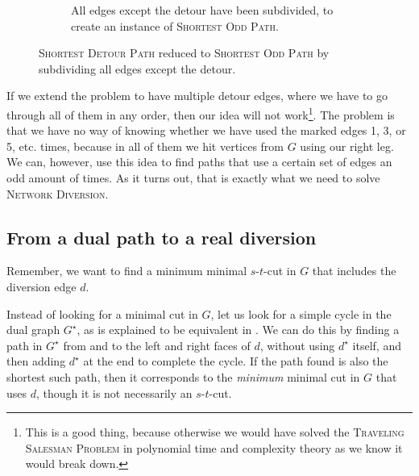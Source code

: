 \begin{figure}[H]
\begin{subfigure}{.45\textwidth}
{
        }
        \caption{All edges except the detour have been subdivided, to create an instance of \textsc{Shortest Odd Path}.}
        \label{figure:subdivided-detour}
    \end{subfigure}%
    \caption{\textsc{Shortest Detour Path} reduced to \textsc{Shortest Odd Path} by subdividing all edges except the detour.}
    \label{figure:subdividing-detours}
\end{figure}

If we extend the problem to have multiple detour edges, where we have to go through all of them in any order, then our idea will not work\footnote{This is a good thing, because otherwise we would have solved the \textsc{Traveling Salesman Problem} in polynomial time and complexity theory as we know it would break down.}.
The problem is that we have no way of knowing whether we have used the marked edges 1, 3, or 5, etc. times, because in all of them we hit vertices from $G$ using our right leg. We can, however, use this idea to find paths that use a certain set of edges an odd amount of times. As it turns out, that is exactly what we need to solve \textsc{Network Diversion}.

\subsection{From a dual path to a real diversion}
Remember, we want to find a minimum minimal $s$-$t$-cut in $G$ that includes the diversion edge $d$.

Instead of looking for a minimal cut in $G$, let us look for a simple cycle in the dual graph $G^\star$, as is explained to be equivalent in . We can do this by finding a path in $G^\star$ from and to the left and right faces of $d$, without using $d^\star$ itself, and then adding $d^\star$ at the end to complete the cycle. If the path found is also the shortest such path, then it corresponds to the \emph{minimum} minimal cut in $G$ that uses $d$, though it is not necessarily an $s$-$t$-cut.

